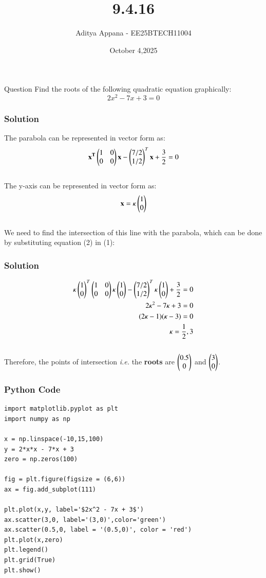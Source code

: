 \documentclass{beamer}
\title %
{9.4.16}
\date{October 4,2025}
\author %
{Aditya Appana - EE25BTECH11004}
\begin{document}
\frame{\titlepage}
\begin{frame}{Question}
Find the roots of the following quadratic equation graphically:
$$2x^2-7x+3=0$$
\end{frame}



\begin{frame}[fragile]
    \frametitle{Solution}
The parabola can be represented in vector form as:
\begin{align}
    \mathbf{x^T}\begin{pmatrix}1&0\\0&0\end{pmatrix}\mathbf{x} - \begin{pmatrix}7/2 \\ 1/2\end{pmatrix}^T\mathbf{x} + \frac{3}{2} = 0
\end{align}\\
The y-axis can be represented in vector form as:
\begin{align}
    \mathbf{x} = \kappa\begin{pmatrix}1\\0\end{pmatrix}
\end{align}\\
We need to find the intersection of this line with the parabola, which can be done by substituting equation (2) in (1):
\end{frame}


\begin{frame}[fragile]
    \frametitle{Solution}
\begin{align}
    \kappa\begin{pmatrix}1\\0\end{pmatrix}^T\begin{pmatrix}1&0\\0&0\end{pmatrix}\kappa\begin{pmatrix}1\\0\end{pmatrix} - \begin{pmatrix}7/2 \\ 1/2\end{pmatrix}^T\kappa\begin{pmatrix}1\\0\end{pmatrix} + \frac{3}{2} = 0\\
    2\kappa^2-7\kappa+3=0\\
    (2\kappa - 1)(\kappa -  3) = 0\\
    \kappa = \frac{1}{2}, 3
\end{align}\\
Therefore, the points of intersection \textit{i.e.} the \textbf{roots} are $\begin{pmatrix}0.5\\0\end{pmatrix}$ and $  \begin{pmatrix}3\\0\end{pmatrix}$.
\end{frame}


\begin{frame}[fragile]
    \frametitle{Python Code}
    \begin{lstlisting}
import matplotlib.pyplot as plt
import numpy as np

x = np.linspace(-10,15,100)
y = 2*x*x - 7*x + 3
zero = np.zeros(100)

fig = plt.figure(figsize = (6,6))
ax = fig.add_subplot(111)

plt.plot(x,y, label='$2x^2 - 7x + 3$')
ax.scatter(3,0, label='(3,0)',color='green')
ax.scatter(0.5,0, label = '(0.5,0)', color = 'red')
plt.plot(x,zero)
plt.legend()
plt.grid(True)
plt.show()

\end{lstlisting}
\end{frame}
\end{document}
